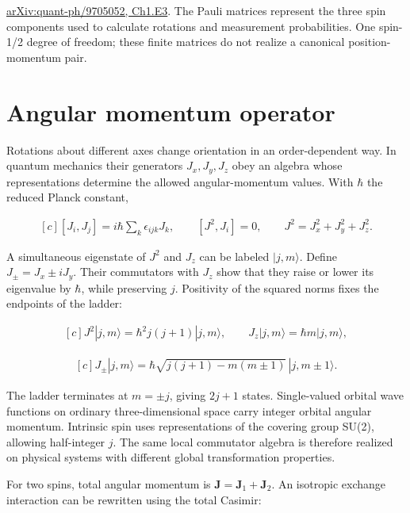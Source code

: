 \documentclass[11pt,oneside]{book}
\newenvironment{centeredalign}{\[\begin{gathered}[c]}{\end{gathered}\]}
\begin{document}
\href{https://arxiv.org/html/quant-ph/9705052#Ch1.E3}{arXiv:quant-ph/9705052, Ch1.E3}. The Pauli matrices represent the three spin components used to calculate rotations and measurement probabilities. One spin-1/2 degree of freedom; these finite matrices do not realize a canonical position-momentum pair.



\clearpage

\section{Angular momentum operator}

\label{topic:angular-momentum-operator}

Rotations about different axes change orientation in an order-dependent way. In quantum mechanics their generators \(J_x,J_y,J_z\) obey an algebra whose representations determine the allowed angular-momentum values. With \(\hbar\) the reduced Planck constant,

\begin{centeredalign}
[J_i,J_j]=i\hbar\sum_k\epsilon_{ijk}J_k,\qquad
[J^2,J_i]=0,\qquad J^2=J_x^2+J_y^2+J_z^2.
\end{centeredalign}

A simultaneous eigenstate of \(J^2\) and \(J_z\) can be labeled \(|j,m\rangle\). Define \(J_\pm=J_x\pm iJ_y\). Their commutators with \(J_z\) show that they raise or lower its eigenvalue by \(\hbar\), while preserving \(j\). Positivity of the squared norms fixes the endpoints of the ladder:

\begin{centeredalign}
J^2|j,m\rangle=\hbar^2j(j+1)|j,m\rangle,\qquad
J_z|j,m\rangle=\hbar m|j,m\rangle,
\end{centeredalign}

\begin{centeredalign}
J_\pm|j,m\rangle=\hbar\sqrt{j(j+1)-m(m\pm1)}\,|j,m\pm1\rangle.
\end{centeredalign}

The ladder terminates at \(m=\pm j\), giving \(2j+1\) states. Single-valued orbital wave functions on ordinary three-dimensional space carry integer orbital angular momentum. Intrinsic spin uses representations of the covering group SU(2), allowing half-integer \(j\). The same local commutator algebra is therefore realized on physical systems with different global transformation properties.

For two spins, total angular momentum is \(\mathbf J=\mathbf J_1+\mathbf J_2\). An isotropic exchange interaction can be rewritten using the total Casimir:
\end{document}
